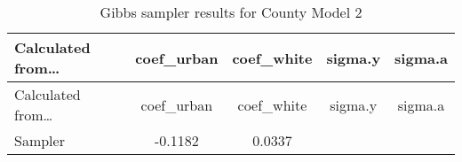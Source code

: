 \documentclass[12pt,twoside]{reedthesis}
\begin{document}
  \begin{longtable}[]{@{}lcccc@{}}
  \caption{Gibbs sampler results for County Model 2
  \label{tab:gibbs_2}}\tabularnewline
  \toprule
  \begin{minipage}[b]{0.25\columnwidth}\raggedright\strut
  Calculated from\ldots{}\strut
  \end{minipage} & \begin{minipage}[b]{0.16\columnwidth}\centering\strut
  coef\_urban\strut
  \end{minipage} & \begin{minipage}[b]{0.16\columnwidth}\centering\strut
  coef\_white\strut
  \end{minipage} & \begin{minipage}[b]{0.12\columnwidth}\centering\strut
  sigma.y\strut
  \end{minipage} & \begin{minipage}[b]{0.12\columnwidth}\centering\strut
  sigma.a\strut
  \end{minipage}\tabularnewline
  \midrule
  \endfirsthead
  \toprule
  \begin{minipage}[b]{0.25\columnwidth}\raggedright\strut
  Calculated from\ldots{}\strut
  \end{minipage} & \begin{minipage}[b]{0.16\columnwidth}\centering\strut
  coef\_urban\strut
  \end{minipage} & \begin{minipage}[b]{0.16\columnwidth}\centering\strut
  coef\_white\strut
  \end{minipage} & \begin{minipage}[b]{0.12\columnwidth}\centering\strut
  sigma.y\strut
  \end{minipage} & \begin{minipage}[b]{0.12\columnwidth}\centering\strut
  sigma.a\strut
  \end{minipage}\tabularnewline
  \midrule
  \endhead
  \begin{minipage}[t]{0.25\columnwidth}\raggedright\strut
  Sampler\strut
  \end{minipage} & \begin{minipage}[t]{0.16\columnwidth}\centering\strut
  -0.1182\strut
  \end{minipage} & \begin{minipage}[t]{0.16\columnwidth}\centering\strut
  0.0337\strut
  \end{minipage} & \begin{minipage}[t]{0.12\columnwidth}\centering\strut

\end{minipage}
\end{longtable}
\end{document}
